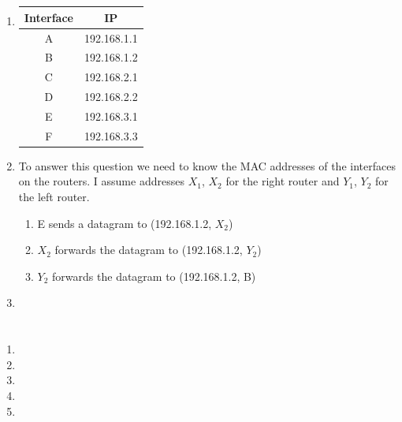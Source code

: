 \documentclass[12pt, a4paper]{article}
\begin{document}
\section{} %
\begin{enumerate}
	\item %
	\begin{tabular}{|c|c|}
		\hline
		Interface & IP\\\hline
		A & 192.168.1.1\\\hline
		B & 192.168.1.2\\\hline
		C & 192.168.2.1\\\hline
		D & 192.168.2.2\\\hline
		E & 192.168.3.1\\\hline
		F & 192.168.3.3\\\hline
	\end{tabular}

	\item %
	To answer this question we need to know the MAC addresses of the interfaces on the routers. I assume addresses $X_1$, $X_2$ for the right router and $Y_1$, $Y_2$ for the left router.

	\begin{enumerate}
		\item E sends a datagram to (192.168.1.2, $X_2$)
		\item $X_2$ forwards the datagram to (192.168.1.2, $Y_2$)
		\item $Y_2$ forwards the datagram to (192.168.1.2, B)
	\end{enumerate}

	\item %
\end{enumerate}

\section{} %

\section{} %
\begin{enumerate}
	\item %
	\item %
	\item %
	\item %
	\item %
\end{enumerate}
\end{document}

